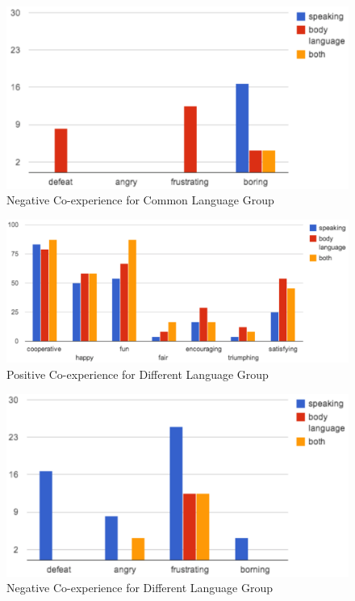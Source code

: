 \begin{figure}[!h]
\centering
\includegraphics[width=0.9\columnwidth]{Figures/US_Co-ex_Com_Neg.png}
\caption{Negative Co-experience for Common Language Group}
\label{fig:US_Co-ex_Com_Neg}
\end{figure}

\begin{figure}[!h]
\centering
\includegraphics[width=0.9\columnwidth]{Figures/US_Co-ex_Dif_Pos.png}
\caption{Positive Co-experience for Different Language Group}
\label{fig:US_Co-ex_Dif_Pos}
\end{figure}

\begin{figure}[!h]
\centering
\includegraphics[width=0.9\columnwidth]{Figures/US_Co-ex_Dif_Neg.png}
\caption{Negative Co-experience for Different Language Group}
\label{fig:US_Co-ex_Dif_Neg}
\end{figure}


